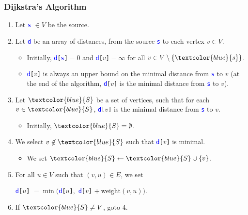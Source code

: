 \documentclass{beamer}
\begin{document}
\begin{frame}%
\frametitle{Dijkstra's Algorithm}

\hypertarget{slide:dijkstra_algorithm}{}

\begin{enumerate}

\item Let \textcolor{blue}{\texttt{s}} $\in V$ be the source.

\item<2-> Let \textcolor{blue}{\texttt{d}} be an array of distances, from the source \textcolor{blue}{\texttt{s}} to each vertex $v \in V$.

\begin{itemize}
\item<3-> Initially, \textcolor{blue}{\texttt{d}}\texttt{[}\textcolor{blue}{\texttt{s}}\texttt{]}$ = 0$ and
\textcolor{blue}{\texttt{d}}\texttt{[}$v$\texttt{]}$ = \infty$ for all $v \in V \setminus \{\textcolor{blue}{s}\}$.

\item<4-> \textcolor{blue}{\texttt{d}}\texttt{[}$v$\texttt{]} is always an upper bound on the minimal distance from
\textcolor{blue}{\texttt{s}} to $v$ (at the end of the algorithm, \textcolor{blue}{\texttt{d}}\texttt{[}$v$\texttt{]} is the minimal distance
from \textcolor{blue}{\texttt{s}} to $v$).

\end{itemize}

\item<5-> Let $\textcolor{blue}{S}$ be a set of vertices, such that for each $v \in \textcolor{blue}{S}$, \textcolor{blue}{\texttt{d}}\texttt{[}$v$\texttt{]}
is the minimal distance from \textcolor{blue}{\texttt{s}} to $v$.
\begin{itemize}
\item<6-> Initially, $\textcolor{blue}{S} = \emptyset$.%
\end{itemize}

\item<7-> We select $v \not\in \textcolor{blue}{S}$ such that \textcolor{blue}{\texttt{d}}\texttt{[}$v$\texttt{]} is minimal.
\begin{itemize}
\item<8-> We set $\textcolor{blue}{S} \leftarrow \textcolor{blue}{S} \cup \{ v \}$.
\end{itemize}
\item<9-> For all $u \in V$ such that $(v, u) \in E$, we set\\
\begin{center}
\textcolor{blue}{\texttt{d}}\texttt{[}$u$\texttt{]} $= \min($\textcolor{blue}{\texttt{d}}\texttt{[}$u$\texttt{]}$,$ \textcolor{blue}{\texttt{d}}\texttt{[}$v$\texttt{]}
$+\ \textrm{weight}(v, u))$.
\end{center}

\item<10-> If $\textcolor{blue}{S} \ne V$, goto 4.

\end{enumerate}

\end{frame}
\end{document}
